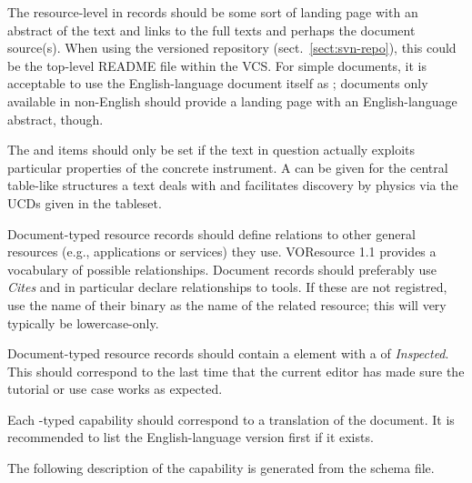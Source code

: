 \documentclass{ivoa}
\begin{document}
The resource-level  in  records should
be some sort of landing page with an abstract of the text and links to
the full texts and perhaps the document source(s).  When using the
versioned repository (sect.~\ref{sect:svn-repo}), this could be the
top-level README file within the VCS.  For simple documents, it is
acceptable to use the English-language document itself as
; documents only available in non-English should
provide a landing page with an English-language abstract, though.

The  and  items should only be set
if the text in question actually exploits particular properties of the
concrete instrument.  A  can be given for the central
table-like structures a text deals with and facilitates discovery by
physics via the UCDs given in the tableset.

Document-typed resource records should define relations to other
general resources (e.g., applications or services)
they use.  VOResource 1.1 provides a vocabulary of possible
relationships. Document records should preferably use \emph{Cites} and
in particular declare relationships to tools.  If these are not
registred, use the name of their binary as the name of the related
resource; this will very typically be lowercase-only.

Document-typed resource records should contain a  element
with a  of \emph{Inspected}.  This should correspond to the
last time that the current editor has made sure the tutorial or use case
works as expected.

Each -typed capability should 
correspond to a translation of the document.  It
is recommended to list the English-language version first if it exists.

The following description of the  capability
is generated from the schema file.
\end{document}
